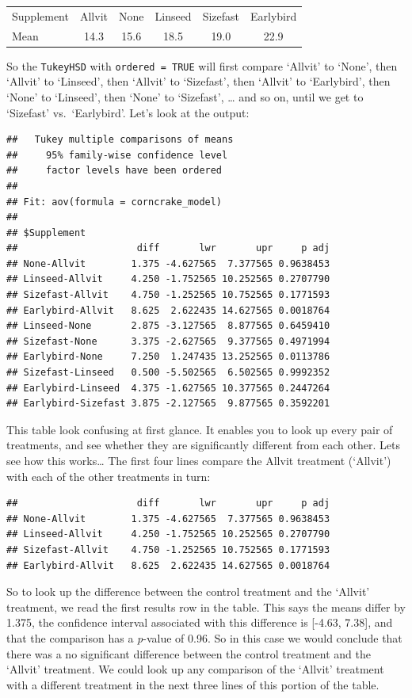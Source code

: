 \documentclass[
]{book}
\begin{document}
\begin{longtable}[]{@{}lccccc@{}}
\toprule()
\endhead
Supplement & Allvit & None & Linseed & Sizefast & Earlybird \\
Mean & 14.3 & 15.6 & 18.5 & 19.0 & 22.9 \\
\bottomrule()
\end{longtable}

So the \texttt{TukeyHSD} with \texttt{ordered\ =\ TRUE} will first compare `Allvit' to `None', then `Allvit' to `Linseed', then `Allvit' to `Sizefast', then `Allvit' to `Earlybird', then `None' to `Linseed', then `None' to `Sizefast', \ldots{} and so on, until we get to `Sizefast' vs.~`Earlybird'. Let's look at the output:

\begin{verbatim}
##   Tukey multiple comparisons of means
##     95% family-wise confidence level
##     factor levels have been ordered
## 
## Fit: aov(formula = corncrake_model)
## 
## $Supplement
##                     diff       lwr       upr     p adj
## None-Allvit        1.375 -4.627565  7.377565 0.9638453
## Linseed-Allvit     4.250 -1.752565 10.252565 0.2707790
## Sizefast-Allvit    4.750 -1.252565 10.752565 0.1771593
## Earlybird-Allvit   8.625  2.622435 14.627565 0.0018764
## Linseed-None       2.875 -3.127565  8.877565 0.6459410
## Sizefast-None      3.375 -2.627565  9.377565 0.4971994
## Earlybird-None     7.250  1.247435 13.252565 0.0113786
## Sizefast-Linseed   0.500 -5.502565  6.502565 0.9992352
## Earlybird-Linseed  4.375 -1.627565 10.377565 0.2447264
## Earlybird-Sizefast 3.875 -2.127565  9.877565 0.3592201
\end{verbatim}

This table look confusing at first glance. It enables you to look up every pair of treatments, and see whether they are significantly different from each other. Lets see how this works\ldots{} The first four lines compare the Allvit treatment (`Allvit') with each of the other treatments in turn:

\begin{verbatim}
##                     diff       lwr       upr     p adj 
## None-Allvit        1.375 -4.627565  7.377565 0.9638453 
## Linseed-Allvit     4.250 -1.752565 10.252565 0.2707790 
## Sizefast-Allvit    4.750 -1.252565 10.752565 0.1771593 
## Earlybird-Allvit   8.625  2.622435 14.627565 0.0018764
\end{verbatim}

So to look up the difference between the control treatment and the `Allvit' treatment, we read the first results row in the table. This says the means differ by 1.375, the confidence interval associated with this difference is {[}-4.63, 7.38{]}, and that the comparison has a \emph{p}-value of 0.96. So in this case we would conclude that there was a no significant difference between the control treatment and the `Allvit' treatment. We could look up any comparison of the `Allvit' treatment with a different treatment in the next three lines of this portion of the table.
\end{document}
